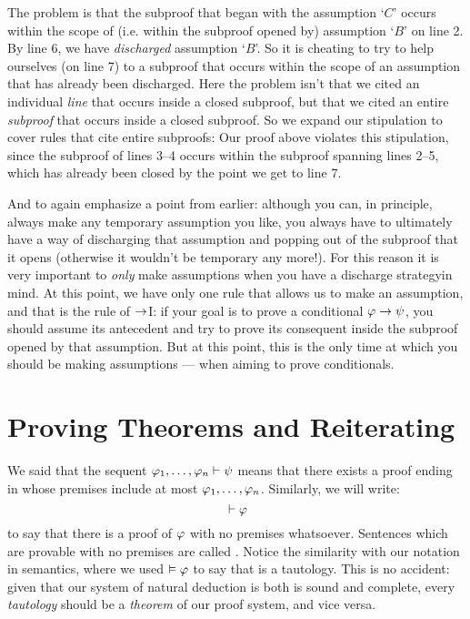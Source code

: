 The problem is that the subproof that began with the assumption `$C$' occurs within the scope of (i.e. within the subproof opened by) assumption `$B$' on line 2. By line 6, we have \emph{discharged} assumption `$B$'. So it is cheating to try to help ourselves (on line 7) to a subproof that occurs within the scope of an assumption that has already been discharged.  Here the problem isn't that we cited an individual \emph{line} that occurs inside a closed subproof, but that we cited an entire \emph{subproof} that occurs inside a closed subproof.  So we expand our stipulation to cover rules that cite entire subproofs:
Our proof above violates this stipulation, since the subproof of lines 3--4 occurs within the subproof spanning lines 2--5, which has already been closed by the point we get to line 7.


And to again emphasize a point from earlier: although you can, in principle, always make any temporary assumption you like, you always have to ultimately have a way of discharging that assumption and popping out of the subproof that it opens (otherwise it wouldn't be temporary any more!).    For this reason it is very important to \emph{only}  make assumptions when you have a discharge strategyin mind.  At this point, we have only one rule that allows us to make an assumption, and that is the rule of $\rightarrow$I: if your goal is to prove a conditional $\mathcal{\varphi} \rightarrow \mathcal{\psi}$, you should assume its antecedent \meta{\varphi} and try to prove its consequent \meta{\psi} inside the subproof opened by that assumption.  But at this point, this is the only time at which you should be making assumptions --- when aiming to prove conditionals.





\section{Proving Theorems and Reiterating}\label{s:TheoremsReiterating}

We said that the sequent $\mathcal{\varphi}_1, \ldots, \mathcal{\varphi}_n \vdash \mathcal{\psi}$ means that there exists a proof ending in \meta{\psi} whose premises include at most $\mathcal{\varphi}_1, \ldots, \mathcal{\varphi}_n$.  Similarly, we will write:
$${} \vdash \mathcal{\varphi}$$
to say that there is a proof of $\mathcal{\varphi}$ with no premises whatsoever.  Sentences which are provable with no premises are called .  Notice the similarity with our notation in semantics, where we used $\vDash \mathcal{\varphi}$ to say that \meta{\varphi} is a tautology.  This is no accident: given that our system of natural deduction is both is sound and complete, every \emph{tautology} should be a \emph{theorem} of our proof system, and vice versa.

